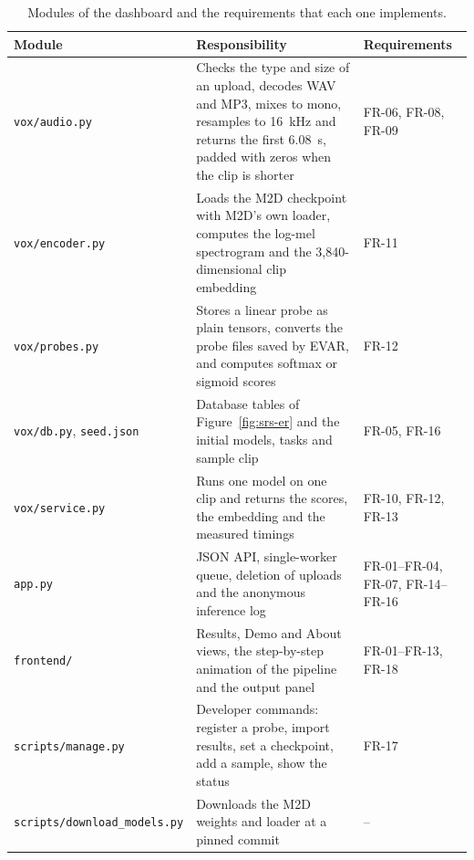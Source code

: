 \begin{table}[htbp]
\centering
\caption[Modules of the dashboard]{Modules of the dashboard and the requirements that each one implements.}
\label{tab:impl-modules}
\small\singlespacing
\begin{tabularx}{\linewidth}{>{\raggedright\arraybackslash}p{4.3cm}Y>{\raggedright\arraybackslash}p{2.4cm}}
\toprule
\textbf{Module} & \textbf{Responsibility} & \textbf{Requirements}\\
\midrule
\texttt{vox/audio.py} & Checks the type and size of an upload, decodes WAV and MP3, mixes to mono, resamples to 16~kHz and returns the first 6.08~s, padded with zeros when the clip is shorter & FR-06, FR-08, FR-09\\
\texttt{vox/encoder.py} & Loads the M2D checkpoint with M2D's own loader, computes the log-mel spectrogram and the 3,840-dimensional clip embedding & FR-11\\
\texttt{vox/probes.py} & Stores a linear probe as plain tensors, converts the probe files saved by EVAR, and computes softmax or sigmoid scores & FR-12\\
\texttt{vox/db.py}, \texttt{seed.json} & Database tables of Figure~\ref{fig:srs-er} and the initial models, tasks and sample clip & FR-05, FR-16\\
\texttt{vox/service.py} & Runs one model on one clip and returns the scores, the embedding and the measured timings & FR-10, FR-12, FR-13\\
\texttt{app.py} & JSON API, single-worker queue, deletion of uploads and the anonymous inference log & FR-01--FR-04, FR-07, FR-14--FR-16\\
\texttt{frontend/} & Results, Demo and About views, the step-by-step animation of the pipeline and the output panel & FR-01--FR-13, FR-18\\
\texttt{scripts/manage.py} & Developer commands: register a probe, import results, set a checkpoint, add a sample, show the status & FR-17\\
\texttt{scripts/\allowbreak download\_models.py} & Downloads the M2D weights and loader at a pinned commit & --\\
\bottomrule
\end{tabularx}
\end{table}

